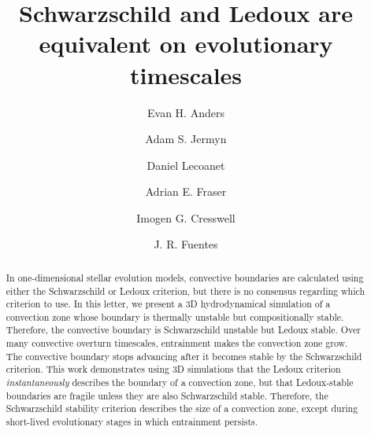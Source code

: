 \documentclass[twocolumn, linenumbers, twocolappendix]{aastex631}
\begin{document}
\title{Schwarzschild and Ledoux are equivalent on evolutionary timescales}
\author[0000-0002-3433-4733]{Evan H. Anders}
\author[0000-0001-5048-9973]{Adam S. Jermyn}
\author[0000-0002-7635-9728]{Daniel Lecoanet}
\author[0000-0003-4323-2082]{Adrian E. Fraser}
\author[0000-0002-4538-7320]{Imogen G. Cresswell}
\author[0000-0003-2124-9764]{J. R. Fuentes}


\begin{abstract}
    In one-dimensional stellar evolution models, convective boundaries are calculated using either the Schwarzschild or Ledoux criterion, but there is no consensus regarding which criterion to use.
    In this letter, we present a 3D hydrodynamical simulation of a convection zone whose boundary is thermally unstable but compositionally stable.
    Therefore, the convective boundary is Schwarzschild unstable but Ledoux stable.
    Over many convective overturn timescales, entrainment makes the convection zone grow.
    The convective boundary stops advancing after it becomes stable by the Schwarzschild criterion.
    This work demonstrates using 3D simulations that the Ledoux criterion \emph{instantaneously} describes the boundary of a convection zone, but that Ledoux-stable boundaries are fragile unless they are also Schwarzschild stable.
    Therefore, the Schwarzschild stability criterion describes the size of a convection zone, except during short-lived evolutionary stages in which entrainment persists.
\end{abstract}
\end{document}

